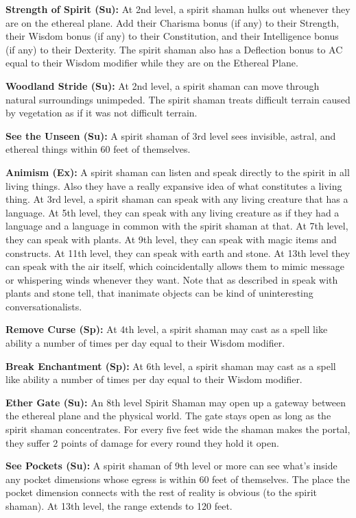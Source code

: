 \textbf{Strength of Spirit (Su):} At 2nd level, a spirit shaman hulks out whenever they are on the ethereal plane. Add their Charisma bonus (if any) to their Strength, their Wisdom bonus (if any) to their Constitution, and their Intelligence bonus (if any) to their Dexterity. The spirit shaman also has a Deflection bonus to AC equal to their Wisdom modifier while they are on the Ethereal Plane.

\textbf{Woodland Stride (Su):} At 2nd level, a spirit shaman can move through natural surroundings unimpeded. The spirit shaman treats difficult terrain caused by vegetation as if it was not difficult terrain.

\textbf{See the Unseen (Su):} A spirit shaman of 3rd level sees invisible, astral, and ethereal things within 60 feet of themselves.

\textbf{Animism (Ex):} A spirit shaman can listen and speak directly to the spirit in all living things. Also they have a really expansive idea of what constitutes a living thing. At 3rd level, a spirit shaman can speak with any living creature that has a language. At 5th level, they can speak with any living creature as if they had a language and a language in common with the spirit shaman at that. At 7th level, they can speak with plants. At 9th level, they can speak with magic items and constructs. At 11th level, they can speak with earth and stone. At 13th level they can speak with the air itself, which coincidentally allows them to mimic message or whispering winds whenever they want. Note that as described in speak with plants and stone tell, that inanimate objects can be kind of uninteresting conversationalists.

\textbf{Remove Curse (Sp):} At 4th level, a spirit shaman may cast  as a spell like ability a number of times per day equal to their Wisdom modifier.

\textbf{Break Enchantment (Sp):} At 6th level, a spirit shaman may cast  as a spell like ability a number of times per day equal to their Wisdom modifier.

\textbf{Ether Gate (Su):} An 8th level Spirit Shaman may open up a gateway between the ethereal plane and the physical world. The gate stays open as long as the spirit shaman concentrates. For every five feet wide the shaman makes the portal, they suffer 2 points of damage for every round they hold it open.

\textbf{See Pockets (Su):} A spirit shaman of 9th level or more can see what's inside any pocket dimensions whose egress is within 60 feet of themselves. The place the pocket dimension connects with the rest of reality is obvious (to the spirit shaman). At 13th level, the range extends to 120 feet.

